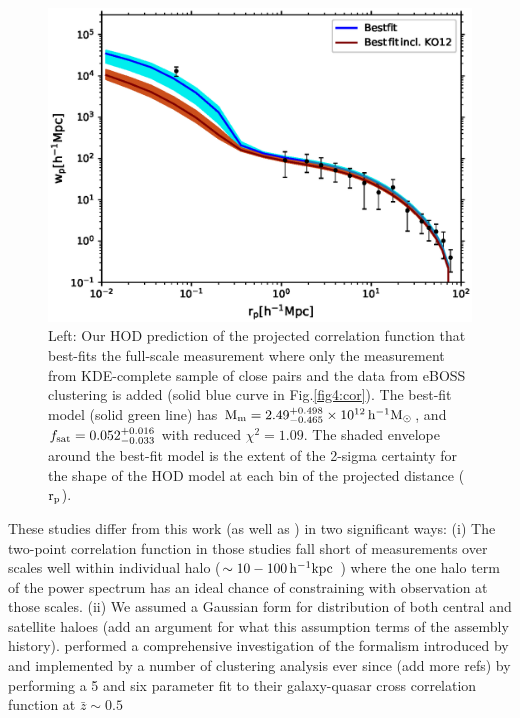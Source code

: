 \documentclass[useAMS,usenatbib]{mn2e}
\begin{document}
\begin{figure}
    \centering
       \includegraphics[angle=0,scale=0.6]{Bestfit_with_wp10c_2pars_1KDE_NOKO12.eps}
    \caption{Left: Our HOD prediction of the projected 
correlation function that best-fits the full-scale measurement where only the measurement from KDE-complete sample of close pairs and the data from eBOSS clustering is added (solid blue curve in 
Fig.\ref{fig4:cor}). The best-fit model (solid green line) has $\rm M_{m} = 
2.49_{-0.465}^{+0.498} \times 10^{12}\, h^{-1} M_{\odot}$, and $f_{\rm sat} = 
0.052_{-0.033}^{+0.016}$ with reduced $\chi^{2} = 1.09$. The shaded envelope 
around the best-fit model is the extent of the 2-sigma certainty for the shape 
of the HOD model at each bin of the projected distance ($\rm r_p$). }\label{fig6:kdeboss}
\end{figure}



 These studies differ from this work (as well as \citep{ko12}) in two 
significant ways: (i) The two-point correlation function in those studies fall 
short of measurements over scales well within individual halo ($\sim 10-100 \, 
\rm h^{-1} kpc$ ) where the one halo term of the power spectrum has an ideal 
chance of constraining with observation at those scales. (ii) We assumed a 
Gaussian form for distribution of both central and satellite haloes (add an 
argument for what this assumption terms of the assembly history). \citet{sh13} 
performed a comprehensive investigation of the formalism introduced by 
\citet{zh05} and implemented by a number of clustering analysis ever since 
\citep{zh07,mi11,zeh11,ric12,ric13}(add more refs) by performing a 5 and six 
parameter fit to their galaxy-quasar cross correlation function at $\bar z \sim 
0.5$  
 
\end{document}
